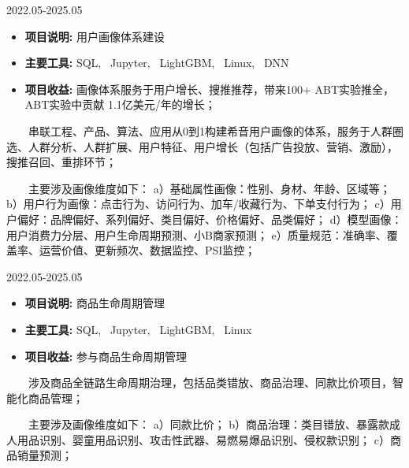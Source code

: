 \documentclass{resume}
\begin{document}
                      {2022.05-2025.05}

\begin{itemize}  [parsep=0.5ex]

  \item   \textbf{  项目说明:  }   {  用户画像体系建设  } 
  \item   \textbf{  主要工具:  }   {  SQL, \ Jupyter, \ LightGBM, \ Linux, \ DNN }
  \item   \textbf{  项目收益:  }   { 画像体系服务于用户增长、搜推推荐，带来100+ ABT实验推全，ABT实验中贡献 1.1亿美元/年的增长； }

\end{itemize}


{   \ \ \ \  串联工程、产品、算法、应用从0到1构建希音用户画像的体系，服务于人群圈选、人群分析、人群扩展、用户特征、用户增长（包括广告投放、营销、激励），搜推召回、重排环节；

\ \ \ \ 主要涉及画像维度如下：
a）基础属性画像：性别、身材、年龄、区域等；
b）用户行为画像：点击行为、访问行为、加车/收藏行为、下单支付行为；
c）用户偏好：品牌偏好、系列偏好、类目偏好、价格偏好、品类偏好；
d）模型画像：用户消费力分层、用户生命周期预测、小B商家预测；
e）质量规范：准确率、覆盖率、运营价值、更新频次、数据监控、PSI监控；
}

\medskip











                      {2022.05-2025.05}

\begin{itemize}  [parsep=0.5ex]

  \item   \textbf{  项目说明:  }   {  商品生命周期管理  } 
  \item   \textbf{  主要工具:  }   {  SQL, \ Jupyter, \ LightGBM, \ Linux }
  \item   \textbf{  项目收益:  }   { 参与商品生命周期管理 }

\end{itemize}


{   \ \ \ \  涉及商品全链路生命周期治理，包括品类错放、商品治理、同款比价项目，智能化商品管理；

\ \ \ \ 主要涉及画像维度如下：
a）同款比价；
b）商品治理：类目错放、暴露款成人用品识别、婴童用品识别、攻击性武器、易燃易爆品识别、侵权款识别；
c）商品销量预测；
}
\end{document}
